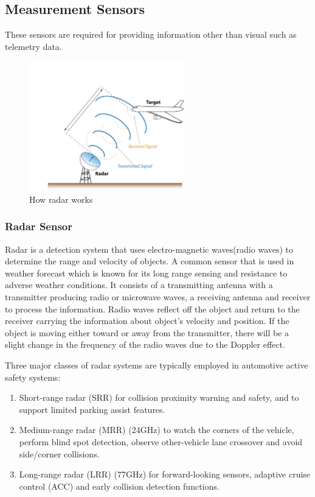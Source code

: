 \subsection{Measurement Sensors}
These sensors are required for providing information other than visual such as telemetry
data.
\begin{figure}[!ht]
	\centering
    \includegraphics[width=0.6\textwidth, scale=0.1]{figures/inkscape/RadarFig.jpg}
    \caption{How radar works}
    \label{fig:radarsensor}
\end{figure}

\subsubsection*{Radar Sensor}
Radar is a detection system that uses electro-magnetic waves(radio waves) to determine the
range and velocity of objects. A common sensor that is used in weather forecast which is known for its
long range sensing and resistance to adverse weather conditions. It consists of a transmitting antenna with a
transmitter producing radio or microwave waves, a receiving antenna and receiver to
process the information. Radio waves reflect off the object and return to the receiver
carrying the information about object's velocity and position.
If the object is moving either toward or away from the transmitter, there will be a slight change in the frequency of the radio waves due to the Doppler effect.

Three major classes of radar systems are typically employed in automotive active safety systems:
\begin{enumerate}
    \item Short-range radar (SRR) for collision proximity warning and safety, and to support limited parking assist features.
    \item Medium-range radar (MRR) (24GHz) to watch the corners of the vehicle, perform blind spot detection, observe other-vehicle lane crossover and avoid side/corner collisions.
    \item Long-range radar (LRR) (77GHz) for forward-looking sensors, adaptive cruise control (ACC) and early collision detection functions.
\end{enumerate}

